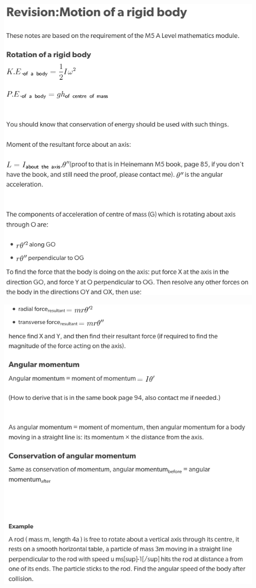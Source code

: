 \documentclass[a4paper]{article}
\begin{document}
\begin{center}
    \includegraphics[scale=0.5]{img_M/24_eg1}
\end{center}
\begin{center}
    \includegraphics[scale=0.5]{img_M/24_eg2}
\end{center}
\end{document}

